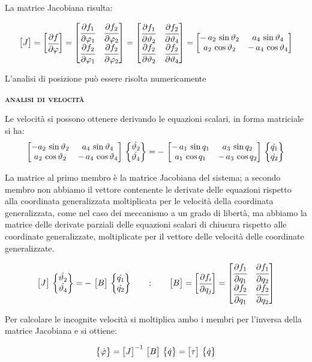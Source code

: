 		La matrice Jacobiana risulta:
		
		\[
		\begin{bmatrix}J\end{bmatrix}=\begin{bmatrix}\cfrac{\partial f}{\partial\varphi}\end{bmatrix}=\begin{bmatrix}\cfrac{\partial f_1}{\partial\varphi_1}&\cfrac{\partial f_2}{\partial\varphi_2}\\ \cfrac{\partial f_2}{\partial\varphi_1}&\cfrac{\partial f_2}{\partial\varphi_2}\end{bmatrix}=\begin{bmatrix}\cfrac{\partial f_1}{\partial\vartheta_2}&\cfrac{\partial f_2}{\partial\vartheta_4}\\ \cfrac{\partial f_2}{\partial\vartheta_2}&\cfrac{\partial f_2}{\partial\vartheta_4}\end{bmatrix} = \begin{bmatrix}-\,a_2\,\sin{\vartheta_2} & a_4\,\sin{\vartheta_4}\\a_2\,\cos{\vartheta_2} & -\,a_4\,\cos{\vartheta_4}\end{bmatrix}
		\]
		
		L'analisi di posizione può essere risolta numericamente
		
		\begin{center}
	{\scshape{\bfseries analisi di velocità}}
	\end{center}
		
		Le velocità si possono ottenere derivando le equazioni scalari, in forma matriciale si ha:
		\[
		\begin{bmatrix}-a_2\,\sin{\vartheta_2}&a_4\,\sin{\vartheta_4}\\a_2\,\cos{\vartheta_2}&-\,a_4\,\cos{\vartheta_4}\end{bmatrix}\,\begin{Bmatrix}\dot{\vartheta_2}\\\dot{\vartheta_4}\end{Bmatrix} = -\,\begin{bmatrix}-\,a_1\,\sin{q_1}&a_3\,\sin{q_2}\\a_1\,\cos{q_1}& -\,a_3\,\cos{q_2}\end{bmatrix}\,\begin{Bmatrix}\dot{q_1}\\\dot{q_2}\end{Bmatrix}
		\]
		
		La matrice al primo membro è la matrice Jacobiana del sistema; a secondo membro non abbiamo il vettore contenente le derivate delle equazioni rispetto alla coordinata generalizzata moltiplicata per le velocità della coordinata generalizzata, come nel caso dei meccanismo a un grado di libertà, ma abbiamo la matrice delle derivate parziali delle equazioni scalari di chiusura rispetto alle coordinate generalizzate, moltiplicate per il vettore delle velocità delle coordinate generalizzate.
	
		\begin{equation*}
		\begin{bmatrix}J\end{bmatrix}\,\begin{Bmatrix}\dot{\vartheta_2}\\\dot{\vartheta_4}\end{Bmatrix} = -\,\begin{bmatrix}B\end{bmatrix}\,\begin{Bmatrix}\dot{q_1}\\\dot{q_2}\end{Bmatrix}\qquad;\qquad
		\begin{bmatrix}B\end{bmatrix} = \begin{bmatrix}\cfrac{\partial f_i}{\partial q_j}\end{bmatrix} = \begin{bmatrix}\cfrac{\partial f_1}{\partial q_1} & \cfrac{\partial f_1}{\partial q_2}\\\cfrac{\partial f_2}{\partial q_1}&\cfrac{\partial f_2}{\partial q_2}\end{bmatrix}
		\end{equation*}
		
		Per calcolare le incognite velocità si moltiplica ambo i membri per l'inversa della matrice Jacobiana e si ottiene:
		
		\[\begin{Bmatrix}\dot{\varphi}\end{Bmatrix}= \begin{bmatrix}J\end{bmatrix}^{-1}\,\begin{bmatrix}B\end{bmatrix}\,\begin{Bmatrix}\dot{q}\end{Bmatrix}= \begin{bmatrix}\tau\end{bmatrix}\,\begin{Bmatrix}\dot{q}\end{Bmatrix}\]
		
